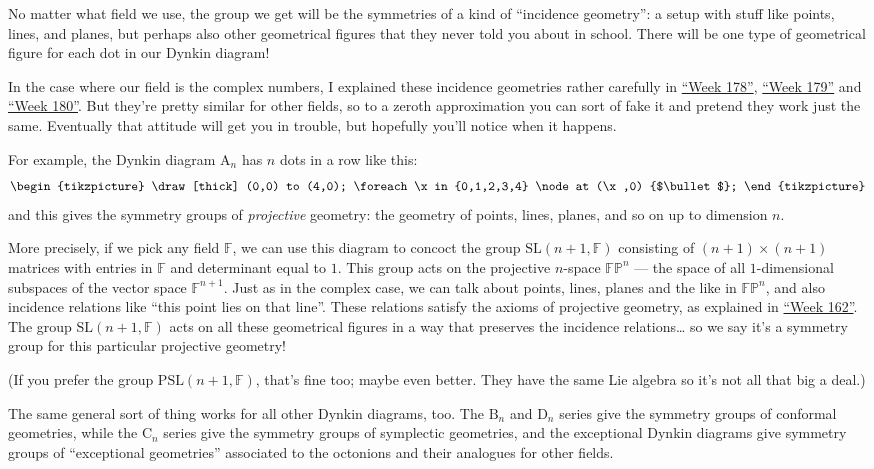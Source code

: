 \documentclass{article}
\begin{document}
No matter what field we use, the group we get will be the symmetries of
a kind of ``incidence geometry'': a setup with stuff like points, lines,
and planes, but perhaps also other geometrical figures that they never
told you about in school. There will be one type of geometrical figure
for each dot in our Dynkin diagram!

In the case where our field is the complex numbers, I explained these
incidence geometries rather carefully in
\protect\hyperlink{week178}{``Week 178''},
\protect\hyperlink{week179}{``Week 179''} and
\protect\hyperlink{week180}{``Week 180''}. But they're pretty similar
for other fields, so to a zeroth approximation you can sort of fake it
and pretend they work just the same. Eventually that attitude will get
you in trouble, but hopefully you'll notice when it happens.

For example, the Dynkin diagram \(\mathrm{A}_n\) has \(n\) dots in a row
like this: \[
  \begin{tikzpicture}
    \draw[thick] (0,0) to (4,0);
    \foreach \x in {0,1,2,3,4}
      \node at (\x,0) {$\bullet$};
  \end{tikzpicture}
\] and this gives the symmetry groups of \emph{projective} geometry: the
geometry of points, lines, planes, and so on up to dimension \(n\).

More precisely, if we pick any field \(\mathbb{F}\), we can use this
diagram to concoct the group \(\mathrm{SL}(n+1,\mathbb{F})\) consisting
of \((n+1)\times(n+1)\) matrices with entries in \(\mathbb{F}\) and
determinant equal to \(1\). This group acts on the projective
\(n\)-space \(\mathbb{FP}^n\) --- the space of all \(1\)-dimensional
subspaces of the vector space \(\mathbb{F}^{n+1}\). Just as in the
complex case, we can talk about points, lines, planes and the like in
\(\mathbb{FP}^n\), and also incidence relations like ``this point lies
on that line''. These relations satisfy the axioms of projective
geometry, as explained in \protect\hyperlink{week162}{``Week 162''}. The
group \(\mathrm{SL}(n+1,\mathbb{F})\) acts on all these geometrical
figures in a way that preserves the incidence relations\ldots{} so we
say it's a symmetry group for this particular projective geometry!

(If you prefer the group \(\mathrm{PSL}(n+1,\mathbb{F})\), that's fine
too; maybe even better. They have the same Lie algebra so it's not all
that big a deal.)

The same general sort of thing works for all other Dynkin diagrams, too.
The \(\mathrm{B}_n\) and \(\mathrm{D}_n\) series give the symmetry
groups of conformal geometries, while the \(\mathrm{C}_n\) series give
the symmetry groups of symplectic geometries, and the exceptional Dynkin
diagrams give symmetry groups of ``exceptional geometries'' associated
to the octonions and their analogues for other fields.
\end{document}
